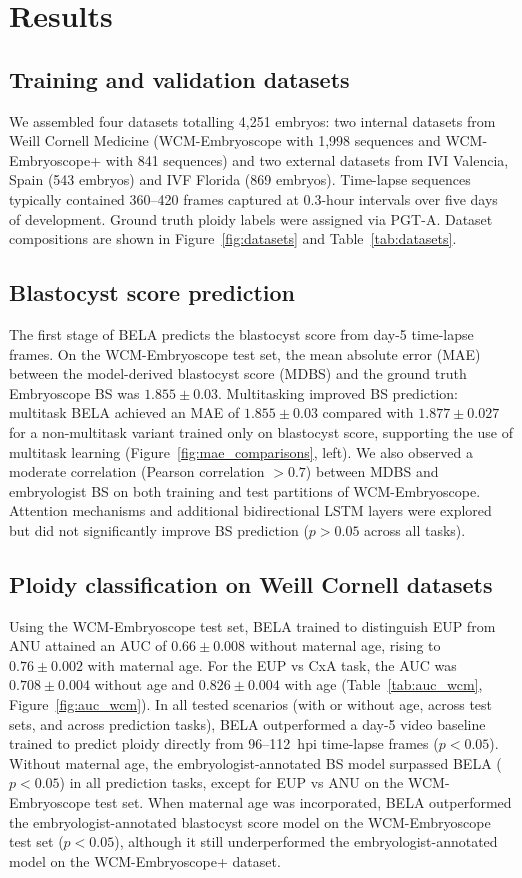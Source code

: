 \documentclass[10pt]{article}
\begin{document}
\section{Results}

\subsection{Training and validation datasets}
We assembled four datasets totalling 4{,}251 embryos: two internal datasets
from Weill Cornell Medicine (WCM-Embryoscope with 1{,}998 sequences and
WCM-Embryoscope+ with 841 sequences) and two external datasets from IVI
Valencia, Spain (543 embryos) and IVF Florida (869 embryos). Time-lapse
sequences typically contained 360--420 frames captured at 0.3-hour intervals
over five days of development. Ground truth ploidy labels were assigned via
PGT-A. Dataset compositions are shown in Figure~\ref{fig:datasets} and
Table~\ref{tab:datasets}.

\subsection{Blastocyst score prediction}
The first stage of BELA predicts the blastocyst score from day-5 time-lapse
frames. On the WCM-Embryoscope test set, the mean absolute error (MAE)
between the model-derived blastocyst score (MDBS) and the ground truth
Embryoscope BS was $1.855 \pm 0.03$. Multitasking improved BS prediction:
multitask BELA achieved an MAE of $1.855 \pm 0.03$ compared with
$1.877 \pm 0.027$ for a non-multitask variant trained only on blastocyst
score, supporting the use of multitask learning
(Figure~\ref{fig:mae_comparisons}, left). We also observed a moderate
correlation (Pearson correlation $>0.7$) between MDBS and embryologist
BS on both training and test partitions of WCM-Embryoscope. Attention
mechanisms and additional bidirectional LSTM layers were explored but did
not significantly improve BS prediction ($p > 0.05$ across all tasks).

\subsection{Ploidy classification on Weill Cornell datasets}
Using the WCM-Embryoscope test set, BELA trained to distinguish EUP from ANU
attained an AUC of $0.66 \pm 0.008$ without maternal age, rising to
$0.76 \pm 0.002$ with maternal age. For the EUP vs CxA task, the AUC was
$0.708 \pm 0.004$ without age and $0.826 \pm 0.004$ with age
(Table~\ref{tab:auc_wcm}, Figure~\ref{fig:auc_wcm}). In all tested scenarios
(with or without age, across test sets, and across prediction tasks), BELA
outperformed a day-5 video baseline trained to predict ploidy directly from
96--112~hpi time-lapse frames ($p < 0.05$). Without maternal age, the
embryologist-annotated BS model surpassed BELA ($p < 0.05$) in all prediction
tasks, except for EUP vs ANU on the WCM-Embryoscope test set. When maternal
age was incorporated, BELA outperformed the embryologist-annotated blastocyst
score model on the WCM-Embryoscope test set ($p < 0.05$), although it still
underperformed the embryologist-annotated model on the WCM-Embryoscope+
dataset.
\end{document}
